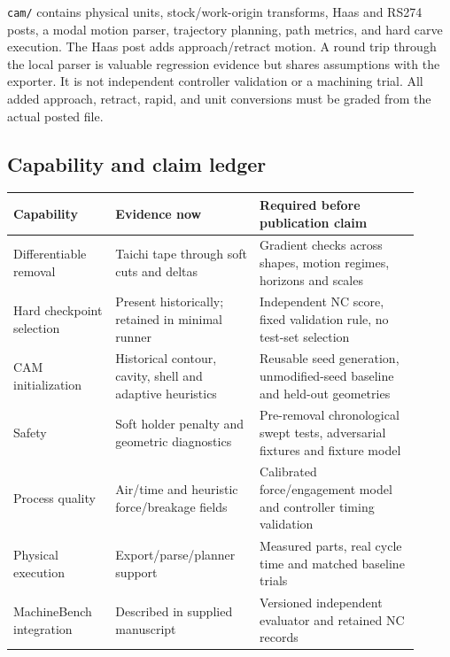 \documentclass[11pt]{article}
\begin{document}
\texttt{cam/} contains physical units, stock/work-origin transforms, Haas and
RS274 posts, a modal motion parser, trajectory planning, path metrics, and hard
carve execution. The Haas post adds approach/retract motion. A round trip
through the local parser is valuable regression evidence but shares assumptions
with the exporter. It is not independent controller validation or a machining
trial. All added approach, retract, rapid, and unit conversions must be graded
from the actual posted file.

\subsection{Capability and claim ledger}
\begin{longtable}{p{0.23\linewidth}p{0.32\linewidth}p{0.36\linewidth}}
\toprule Capability & Evidence now & Required before publication claim\\\midrule
Differentiable removal & Taichi tape through soft cuts and deltas & Gradient checks across shapes, motion regimes, horizons and scales\\
Hard checkpoint selection & Present historically; retained in minimal runner & Independent NC score, fixed validation rule, no test-set selection\\
CAM initialization & Historical contour, cavity, shell and adaptive heuristics & Reusable seed generation, unmodified-seed baseline and held-out geometries\\
Safety & Soft holder penalty and geometric diagnostics & Pre-removal chronological swept tests, adversarial fixtures and fixture model\\
Process quality & Air/time and heuristic force/breakage fields & Calibrated force/engagement model and controller timing validation\\
Physical execution & Export/parse/planner support & Measured parts, real cycle time and matched baseline trials\\
MachineBench integration & Described in supplied manuscript & Versioned independent evaluator and retained NC records\\
\bottomrule
\end{longtable}
\end{document}
